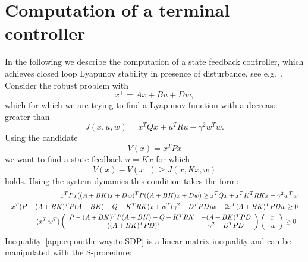 
\chapter{Computation of a terminal controller}\label{app:terminal:controller}
%
%
%
In the following we describe the computation of a state feedback controller, which achieves closed loop Lyapunov stability in presence of disturbance, see e.g.~\cite{Boyd:94}.
%
Consider the robust problem with 
%
\begin{equation}
	x^+ = A x + B u + D w,
\end{equation}
%
which for which we are trying to find a Lyapunov function with a decrease greater than
%
\begin{equation}
	J(x,u,w) = x^TQx + u^TRu - \gamma^2 w^T w.
\end{equation}
%
Using the candidate
%
\begin{equation}
	V(x) = x^T P x
\end{equation}
%
we want to find a state feedback $u = Kx$ for which
%
\begin{equation}
	V(x) - V(x^+)\geq J(x,K x,w)
\end{equation}
%
holds. Using the system dynamics this condition takes the form:
%
\begin{equation}\label{app:eq:on:the:way:to:SDP}\Resize{\begin{aligned}
	x^T P x ((A+BK)x + Dw)^T P ((A+BK)x + Dw) \geq x^T Q x + x^T K^T R Kx - \gamma^2 w^T w\\
	x^T(P - (A+BK)^T P (A+BK) - Q - K^T R K)x + w^T(\gamma^2-D^T P D)w - 2 x^T(A+BK)^T P D w \geq 0\\
	(x^T\,w^T)\left(\begin{array}{cc}
	P - (A+BK)^T P (A+BK) - Q - K^T R K & -(A+BK)^T P D \\
	- ((A+BK)^T P D)^T & \gamma^2 - D^T P D
	\end{array}\right)\left(\begin{array}{c}
	x \\ w
	\end{array}\right)\geq 0 .
\end{aligned}}\end{equation}
%
Inequality~\eqref{app:eq:on:the:way:to:SDP} is a linear matrix inequality and can be manipulated with the S-procedure:
%
